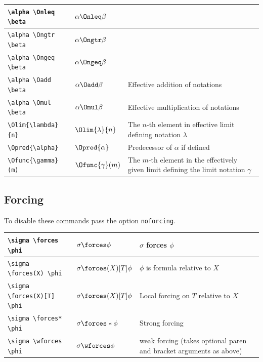 \documentclass[leqno,11pt]{amsart}
\newcommand{\tab}{\hspace{1cm}}
\begin{document}
\begin{tabular}{l |  l | l}
	\tab \verb=\alpha \Onleq  \beta=        & \( 	\alpha \Onleq  \beta   \) & \\ \midrule
	\tab \verb=\alpha \Ongtr  \beta=        & \( 	\alpha \Ongtr  \beta   \)                          & \\ 
	\tab \verb=\alpha \Ongeq  \beta=        & \( 	\alpha \Ongeq  \beta   \)                          & \\\midrule
	\verb=\alpha \Oadd \beta=        & \( 	\alpha \Oadd \beta   \)                          & Effective addition of notations \\ \midrule
	\verb=\alpha \Omul  \beta=        & \( 	\alpha \Omul  \beta   \)                          & Effective multiplication of notations \\  \midrule
	\verb=\Olim{\lambda}{n}=          & \( 	\Olim{\lambda}{n}     \)                          & The \( n \)-th element in effective limit defining notation \( \lambda \)\\  \midrule
  \verb=\Opred{\alpha}=             & \(  \Opred{\alpha}          \)                          & Predecessor of \( \alpha \) if defined \\ \midrule
  \verb=\Ofunc{\gamma}(m)= & \( \Ofunc{\gamma}(m) \)  & The \( m \)-th element in the effectively given limit defining the limit notation \( \gamma \) \\   
		\bottomrule
	\end{tabular}

\subsection{Forcing}
To disable these commands pass the option \verb=noforcing=.\\

\begin{tabular}{l |  l | l}\toprule
	\verb=\sigma \forces \phi=	        	& \(  \sigma \forces \phi         \)	& \( \sigma \) forces \( \phi \) \\ \midrule
	\verb=\sigma \forces(X) \phi=               & \(  \sigma \forces(X)[T] \phi    \)   & \( \phi \) is formula relative to \( X \) \\ \midrule
	\verb=\sigma \forces(X)[T] \phi=               & \(  \sigma \forces(X)[T] \phi    \)   & Local forcing on \( T \) relative to \( X \) \\ \midrule
	\verb=\sigma \forces* \phi=                    & \(  \sigma \forces* \phi        \)    & Strong forcing \\ \midrule
	\verb=\sigma \wforces \phi=                    & \(  \sigma \wforces \phi        \)    & weak forcing (takes optional paren and bracket arguments as above)  \\ 
	\bottomrule
\end{tabular}
\end{document}
